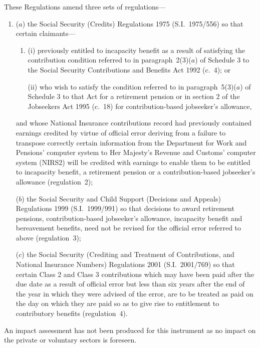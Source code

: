 \documentclass[12pt,a4paper]{article}
\begin{document}
These Regulations amend three sets of regulations—
\begin{enumerate}\item[]
($a$) the Social Security (Credits) Regulations 1975 (S.I.~1975/556) so that certain claimants—
\begin{enumerate}\item[]
(i) previously entitled to incapacity benefit as a result of satisfying the contribution condition referred to in paragraph~2(3)($a$)  of Schedule 3 to the Social Security Contributions and Benefits Act 1992 (c.~4); or

(ii) who wish to satisfy the condition referred to in paragraph~5(3)($a$)  of Schedule 3 to that Act for a retirement pension or in section 2 of the Jobseekers Act 1995 (c.~18) for contribution-based jobseeker’s allowance,
\end{enumerate}
and whose National Insurance contributions record had previously contained earnings credited by virtue of official error deriving from a failure to transpose correctly certain information from the Department for Work and Pensions’ computer system to Her Majesty’s Revenue and Customs’ computer system (NIRS2) will be credited with earnings to enable them to be entitled to incapacity benefit, a retirement pension or a contribution-based jobseeker’s allowance (regulation~2);

($b$) the Social Security and Child Support (Decisions and Appeals) Regulations 1999 (S.I.~1999/991) so that decisions to award retirement pensions, contribution-based jobseeker’s allowance, incapacity benefit and bereavement benefits, need not be revised for the official error referred to above (regulation~3);

($c$) the Social Security (Crediting and Treatment of Contributions, and National Insurance Numbers) Regulations 2001 (S.I.~2001/769) so that certain Class 2 and Class 3 contributions which may have been paid after the due date as a result of official error but less than six years after the end of the year in which they were advised of the error, are to be treated as paid on the day on which they are paid so as to give rise to entitlement to contributory benefits (regulation~4).
\end{enumerate}

An impact assessment has not been produced for this instrument as no impact on the private or voluntary sectors is foreseen. 
\end{document}
